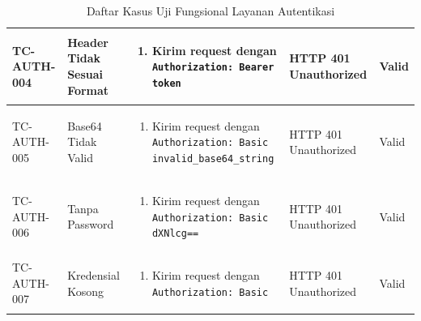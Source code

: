 \begin{table}[H]
\begin{adjustbox}{width=\textwidth}
\begin{tabular}{|p{1.5cm}|p{3.2cm}|p{5cm}|p{3.2cm}|p{1.2cm}|}
      TC-AUTH-004                                                                      & Header Tidak Sesuai Format &
      \begin{enumerate}[leftmargin=*,noitemsep,topsep=0pt,label=\arabic*.,widest=99]
        \item Kirim request dengan \texttt{Authorization: Bearer token}
      \end{enumerate}                 &
      HTTP 401 Unauthorized                                                            & Valid                                                                                              \\ \hline

      TC-AUTH-005                                                                      & Base64 Tidak Valid         &
      \begin{enumerate}[leftmargin=*,noitemsep,topsep=0pt,label=\arabic*.,widest=99]
        \item Kirim request dengan \texttt{Authorization: Basic invalid\_base64\_string}
      \end{enumerate} &
      HTTP 401 Unauthorized                                                            & Valid                                                                                              \\ \hline

      TC-AUTH-006                                                                      & Tanpa Password             &
      \begin{enumerate}[leftmargin=*,noitemsep,topsep=0pt,label=\arabic*.,widest=99]
        \item Kirim request dengan \texttt{Authorization: Basic dXNlcg==}
      \end{enumerate}                &
      HTTP 401 Unauthorized                                                            & Valid                                                                                              \\ \hline

      TC-AUTH-007                                                                      & Kredensial Kosong          &
      \begin{enumerate}[leftmargin=*,noitemsep,topsep=0pt,label=\arabic*.,widest=99]
        \item Kirim request dengan \texttt{Authorization: Basic}
      \end{enumerate}                 &
      HTTP 401 Unauthorized                                                            & Valid                                                                                              \\ \hline
    \end{tabular}
  \end{adjustbox}
  \caption{Daftar Kasus Uji Fungsional Layanan Autentikasi}
  \label{tab:auth-test-cases}
\end{table}
